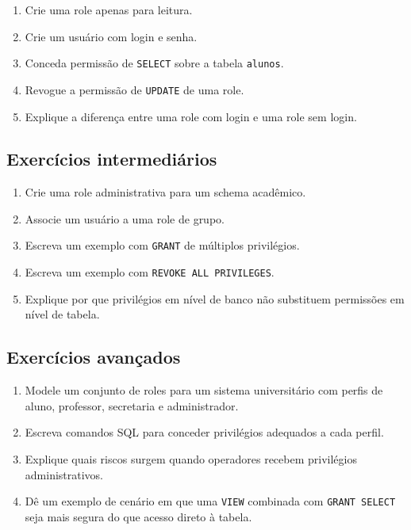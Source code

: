 \begin{enumerate}
    \item Crie uma role apenas para leitura.
    \item Crie um usuário com login e senha.
    \item Conceda permissão de \texttt{SELECT} sobre a tabela \texttt{alunos}.
    \item Revogue a permissão de \texttt{UPDATE} de uma role.
    \item Explique a diferença entre uma role com login e uma role sem login.
\end{enumerate}

\subsection{Exercícios intermediários}

\begin{enumerate}
    \item Crie uma role administrativa para um schema acadêmico.
    \item Associe um usuário a uma role de grupo.
    \item Escreva um exemplo com \texttt{GRANT} de múltiplos privilégios.
    \item Escreva um exemplo com \texttt{REVOKE ALL PRIVILEGES}.
    \item Explique por que privilégios em nível de banco não substituem permissões em nível de tabela.
\end{enumerate}

\subsection{Exercícios avançados}

\begin{enumerate}
    \item Modele um conjunto de roles para um sistema universitário com perfis de aluno, professor, secretaria e administrador.
    \item Escreva comandos SQL para conceder privilégios adequados a cada perfil.
    \item Explique quais riscos surgem quando operadores recebem privilégios administrativos.
    \item Dê um exemplo de cenário em que uma \texttt{VIEW} combinada com \texttt{GRANT SELECT} seja mais segura do que acesso direto à tabela.
\end{enumerate}

